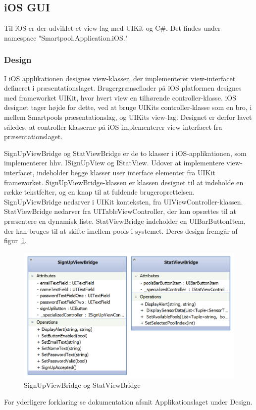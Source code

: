 \subsection{iOS GUI}
Til iOS er der udviklet et view-lag med UIKit og C\#. Det findes under namespace "Smartpool.Application.iOS."

\subsubsection{Design}
I iOS applikationen designes view-klasser, der implementerer view-interfacet defineret i præsentationslaget. Brugergrænseflader på iOS platformen designes med frameworket UIKit, hvor hvert view en tilhørende controller-klasse. iOS designet tager højde for dette, ved at bruge UIKits controller-klasse som en bro, i mellem Smartpools præsentationslag, og UIKits view-lag. Designet er derfor lavet således, at controller-klasserne på iOS implementerer view-interfacet fra præsentationslaget.

SignUpViewBridge og StatViewBridge er de to klasser i iOS-applikationen, som implementerer hhv. ISignUpView og IStatView. Udover at implementere view-interfacet, indeholder begge klasser user interface elementer fra UIKit frameworket. SignUpViewBridge-klassen er klassen designet til at indeholde en række tekstfelter, og en knap til at fuldende brugeroprettelsen. SignUpViewBridge nedarver i UIKit konteksten, fra UIViewController-klassen. StatViewBridge nedarver fra UITableViewController, der kan opsættes til at præsentere en dynamisk liste. StatViewBridge indeholder en UIBarButtonItem, der kan bruges til at skifte imellem pools i systemet. Deres design fremgår af figur~\ref{fig:ios_viewbridges}.

\begin{figure}
	\centering
	\includegraphics[width=0.7\linewidth]{figs/design/ios_viewbridges}
	\caption{SignUpViewBridge og StatViewBridge}
	\label{fig:ios_viewbridges}
\end{figure}

For yderligere forklaring se dokumentation afsnit Applikationslaget under Design.